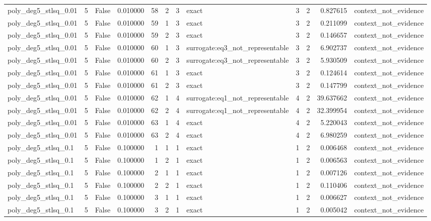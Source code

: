 \begin{tabular}{lrrrrrrlrrrl}
poly\_deg5\_stlsq\_0.01 & 5 & False & 0.010000 & 58 & 2 & 3 & exact & 3 & 2 & 0.827615 & context\_not\_evidence \\
poly\_deg5\_stlsq\_0.01 & 5 & False & 0.010000 & 59 & 1 & 3 & exact & 3 & 2 & 0.211099 & context\_not\_evidence \\
poly\_deg5\_stlsq\_0.01 & 5 & False & 0.010000 & 59 & 2 & 3 & exact & 3 & 2 & 0.146657 & context\_not\_evidence \\
poly\_deg5\_stlsq\_0.01 & 5 & False & 0.010000 & 60 & 1 & 3 & surrogate:eq3\_not\_representable & 3 & 2 & 6.902737 & context\_not\_evidence \\
poly\_deg5\_stlsq\_0.01 & 5 & False & 0.010000 & 60 & 2 & 3 & surrogate:eq3\_not\_representable & 3 & 2 & 5.930509 & context\_not\_evidence \\
poly\_deg5\_stlsq\_0.01 & 5 & False & 0.010000 & 61 & 1 & 3 & exact & 3 & 2 & 0.124614 & context\_not\_evidence \\
poly\_deg5\_stlsq\_0.01 & 5 & False & 0.010000 & 61 & 2 & 3 & exact & 3 & 2 & 0.147799 & context\_not\_evidence \\
poly\_deg5\_stlsq\_0.01 & 5 & False & 0.010000 & 62 & 1 & 4 & surrogate:eq1\_not\_representable & 4 & 2 & 39.637662 & context\_not\_evidence \\
poly\_deg5\_stlsq\_0.01 & 5 & False & 0.010000 & 62 & 2 & 4 & surrogate:eq1\_not\_representable & 4 & 2 & 32.399954 & context\_not\_evidence \\
poly\_deg5\_stlsq\_0.01 & 5 & False & 0.010000 & 63 & 1 & 4 & exact & 4 & 2 & 5.220043 & context\_not\_evidence \\
poly\_deg5\_stlsq\_0.01 & 5 & False & 0.010000 & 63 & 2 & 4 & exact & 4 & 2 & 6.980259 & context\_not\_evidence \\
poly\_deg5\_stlsq\_0.1 & 5 & False & 0.100000 & 1 & 1 & 1 & exact & 1 & 2 & 0.006468 & context\_not\_evidence \\
poly\_deg5\_stlsq\_0.1 & 5 & False & 0.100000 & 1 & 2 & 1 & exact & 1 & 2 & 0.006563 & context\_not\_evidence \\
poly\_deg5\_stlsq\_0.1 & 5 & False & 0.100000 & 2 & 1 & 1 & exact & 1 & 2 & 0.007126 & context\_not\_evidence \\
poly\_deg5\_stlsq\_0.1 & 5 & False & 0.100000 & 2 & 2 & 1 & exact & 1 & 2 & 0.110406 & context\_not\_evidence \\
poly\_deg5\_stlsq\_0.1 & 5 & False & 0.100000 & 3 & 1 & 1 & exact & 1 & 2 & 0.006627 & context\_not\_evidence \\
poly\_deg5\_stlsq\_0.1 & 5 & False & 0.100000 & 3 & 2 & 1 & exact & 1 & 2 & 0.005042 & context\_not\_evidence \\

\end{tabular}
